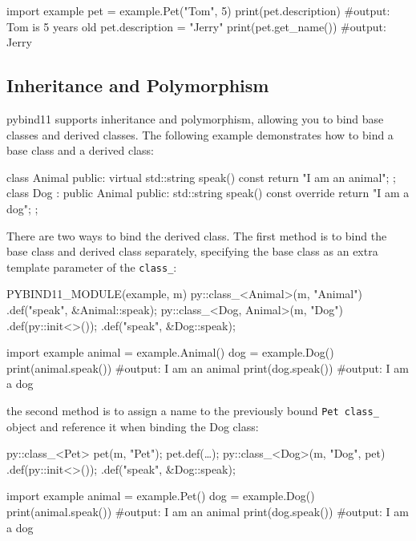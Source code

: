 \begin{codeblock}[language=python]
import example
pet = example.Pet("Tom", 5)
print(pet.description) #output: Tom is 5 years old
pet.description = "Jerry"
print(pet.get_name()) #output: Jerry
\end{codeblock}

\subsection{Inheritance and Polymorphism}

pybind11 supports inheritance and polymorphism, allowing you to bind base classes and derived classes. The following example demonstrates how to bind a base class and a derived class:

\begin{codeblock}[language=C++]
class Animal {
public:
    virtual std::string speak() const {
        return "I am an animal";
    }
};
class Dog : public Animal {
public:
    std::string speak() const override {
        return "I am a dog";
    }
};
\end{codeblock}

There are two ways to bind the derived class. The first method is to bind the base class and derived class separately, specifying the base class as an extra template parameter of the \texttt{class\_}:

\begin{codeblock}[language=C++]
PYBIND11_MODULE(example, m) {
    py::class_<Animal>(m, "Animal")
        .def("speak", &Animal::speak);
    py::class_<Dog, Animal>(m, "Dog")
        .def(py::init<>());
        .def("speak", &Dog::speak);
}
\end{codeblock}

\begin{codeblock}[language=python]
import example
animal = example.Animal()
dog = example.Dog()
print(animal.speak()) #output: I am an animal
print(dog.speak()) #output: I am a dog
\end{codeblock}

the second method is to assign a name to the previously bound \texttt{Pet class\_} object and reference it when binding the Dog class:

\begin{codeblock}[language=C++]
py::class_<Pet> pet(m, "Pet");
pet.def(\dots);
py::class_<Dog>(m, "Dog", pet)
    .def(py::init<>());
    .def("speak", &Dog::speak);
\end{codeblock}

\begin{codeblock}[language=python]
import example
animal = example.Pet()
dog = example.Dog()
print(animal.speak()) #output: I am an animal
print(dog.speak()) #output: I am a dog
\end{codeblock}


